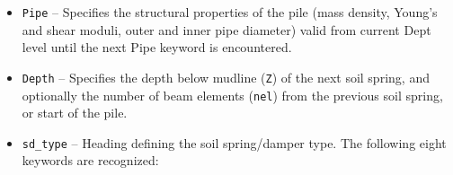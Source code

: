 \clearpage\noindent
\begin{minipage}{0.5\textwidth}\raggedright
\begin{itemize}
\item{\tt Pipe} --
  Specifies the structural properties of the pile (mass density,
  Young's and shear moduli, outer and inner pipe diameter)
  valid from current Dept level until the next Pipe keyword is encountered.

\item{\tt Depth} --
  Specifies the depth below mudline ({\tt Z}) of the next soil spring,
  and optionally the number of beam elements ({\tt nel}) from the previous
  soil spring, \newline or start of the pile.

\item{\tt sd\_type} --
  Heading defining the soil spring/damper type.
  The following eight keywords are recognized:


\end{itemize}
\end{minipage}
